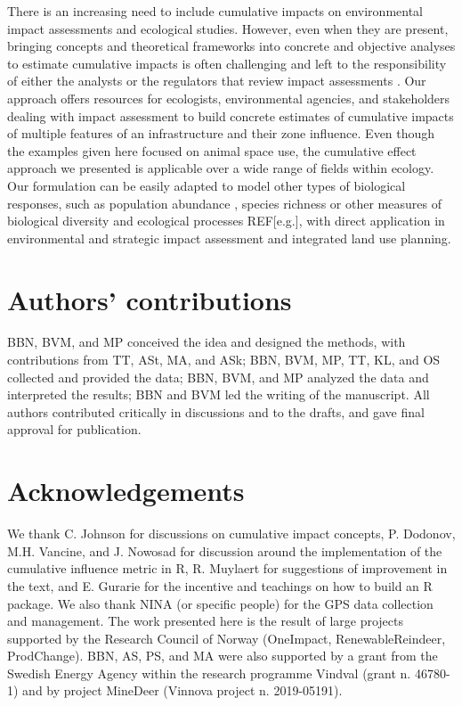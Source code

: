 \documentclass[titlepage]{article}
\begin{document}
There is an increasing need to include cumulative impacts on environmental impact assessments and ecological studies. However, even when they are present, bringing concepts and theoretical frameworks into concrete and objective analyses to estimate cumulative impacts is often challenging and left to the responsibility of either the analysts or the regulators that review impact assessments \citep{johnson_regulating_2011}. Our approach offers resources for ecologists, environmental agencies, and stakeholders dealing with impact assessment to build concrete estimates of cumulative impacts of multiple features of an infrastructure and their zone influence. 
Even though the examples given here focused on animal space use, the cumulative effect approach we presented is applicable over a wide range
of fields within ecology. Our formulation can be easily adapted to model other types of biological responses, such as population abundance \citep[e.g.][]{benitez-lopez_impacts_2010}, species richness \citep[e.g.][]{ficetola_ecological_2009} or other measures of biological diversity and ecological processes REF[e.g.], with direct application in environmental and strategic impact assessment and integrated land use planning.
      
\section*{Authors’ contributions}

BBN, BVM, and MP conceived the idea and designed the methods, with contributions from TT, ASt, MA, and ASk; BBN, BVM, MP, TT, KL, and OS collected and provided the data; BBN, BVM, and MP analyzed the data and interpreted the results; BBN and BVM led the writing of the manuscript. All authors contributed critically in discussions and to the drafts, and gave final approval for publication.

\section*{Acknowledgements}

We thank C. Johnson for discussions on cumulative impact concepts, P. Dodonov, M.H. Vancine, and J. Nowosad for discussion around the implementation of the cumulative influence metric in R, R. Muylaert for suggestions of improvement in the text, and E. Gurarie for the incentive and teachings on how to build an R package. We also thank NINA (or specific people) for the GPS data collection and management. The work presented here is the result of large projects supported by the Research Council of Norway (OneImpact, RenewableReindeer, ProdChange). BBN, AS, PS, and MA were also supported by a grant from the Swedish Energy Agency within the research programme Vindval (grant n. 46780-1) and by project MineDeer (Vinnova project n. 2019-05191).
\end{document}

